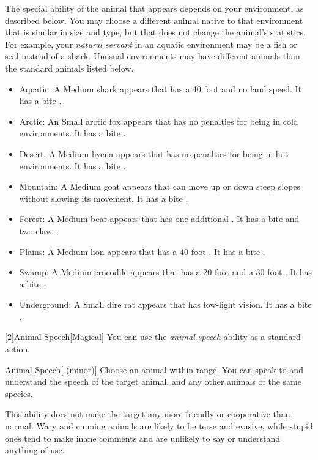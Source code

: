         The special ability of the animal that appears depends on your environment, as described below.
        You may choose a different animal native to that environment that is similar in size and type, but that does not change the animal's statistics.
        For example, your \textit{natural servant} in an aquatic environment may be a fish or seal instead of a shark.
        Unusual environments may have different animals than the standard animals listed below.
        \begin{itemize}
            \item Aquatic: A Medium shark appears that has a 40 foot  and no land speed.
                It has a bite .
            \item Arctic: An Small arctic fox appears that has no penalties for being in cold environments.
                It has a bite .
            \item Desert: A Medium hyena appears that has no penalties for being in hot environments.
                It has a bite .
            \item Mountain: A Medium goat appears that can move up or down steep slopes without slowing its movement.
                It has a bite .
            \item Forest: A Medium bear appears that has one additional .
                It has a bite  and two claw .
            \item Plains: A Medium lion appears that has a 40 foot .
                It has a bite .
            \item Swamp: A Medium crocodile appears that has a 20 foot  and a 30 foot .
                It has a bite .
            \item Underground: A Small dire rat appears that has low-light vision.
                It has a bite .
        \end{itemize}

        [2]{Animal Speech}[Magical] You can use the \textit{animal speech} ability as a standard action.
        \begin{attuneability}{Animal Speech}[ (minor)]
            Choose an animal within \rnglong range.
            You can speak to and understand the speech of the target animal, and any other animals of the same species.

            This ability does not make the target any more friendly or cooperative than normal.
            Wary and cunning animals are likely to be terse and evasive, while stupid ones tend to make inane comments and are unlikely to say or understand anything of use.
        \end{attuneability}

